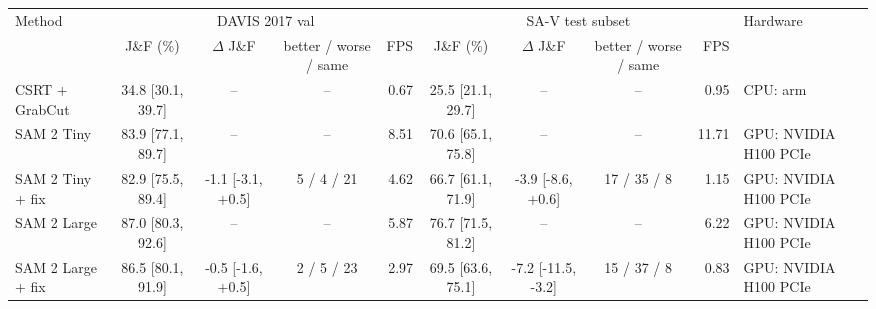 \begin{tabular}{lcccrcccrl}
\toprule
Method & \multicolumn{4}{c}{DAVIS 2017 val} & \multicolumn{4}{c}{SA-V test subset} & Hardware \\
\cmidrule(lr){2-5}\cmidrule(lr){6-9}
 & J\&F (\%) & $\Delta$ J\&F & better / worse / same & FPS & J\&F (\%) & $\Delta$ J\&F & better / worse / same & FPS & \\
\midrule
CSRT + GrabCut & 34.8 [30.1, 39.7] & -- & -- & 0.67 & 25.5 [21.1, 29.7] & -- & -- & 0.95 & CPU: arm \\
SAM 2 Tiny & 83.9 [77.1, 89.7] & -- & -- & 8.51 & 70.6 [65.1, 75.8] & -- & -- & 11.71 & GPU: NVIDIA H100 PCIe \\
SAM 2 Tiny + fix & 82.9 [75.5, 89.4] & -1.1 [-3.1, +0.5] & 5 / 4 / 21 & 4.62 & 66.7 [61.1, 71.9] & -3.9 [-8.6, +0.6] & 17 / 35 / 8 & 1.15 & GPU: NVIDIA H100 PCIe \\
SAM 2 Large & 87.0 [80.3, 92.6] & -- & -- & 5.87 & 76.7 [71.5, 81.2] & -- & -- & 6.22 & GPU: NVIDIA H100 PCIe \\
SAM 2 Large + fix & 86.5 [80.1, 91.9] & -0.5 [-1.6, +0.5] & 2 / 5 / 23 & 2.97 & 69.5 [63.6, 75.1] & -7.2 [-11.5, -3.2] & 15 / 37 / 8 & 0.83 & GPU: NVIDIA H100 PCIe \\
\bottomrule
\end{tabular}
